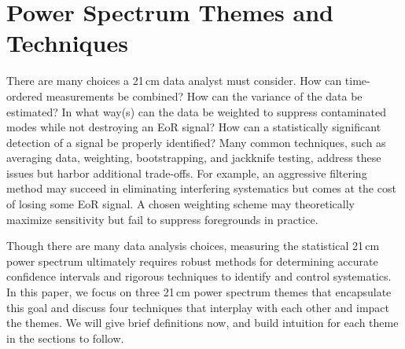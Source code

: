 \documentclass[preprint2,numberedappendix,tighten]{aastex6}  %
\begin{document}

\section{Power Spectrum Themes and Techniques}
\label{sec:Themes}

There are many choices a 21\,cm data analyst must consider. %
How can time-ordered measurements be combined? How can the 
variance of the data be estimated? In what way(s) can the data be weighted to suppress contaminated modes while not 
destroying an EoR signal? How can a statistically significant detection of a signal be properly identified? Many common techniques, such as 
averaging data, weighting, bootstrapping, and jackknife testing, address these issues but harbor additional trade-offs. For 
example, an aggressive filtering method may succeed in eliminating interfering systematics but comes at the cost of losing 
some EoR signal. A chosen weighting scheme may theoretically maximize sensitivity but fail to suppress foregrounds in practice. 

Though there are many data analysis choices, measuring the statistical 21\,cm power spectrum ultimately requires robust 
methods for determining accurate confidence intervals and rigorous techniques to identify and control systematics.  In this 
paper, we focus on three 21\,cm power spectrum themes that encapsulate this goal and discuss four techniques that interplay 
with each other and impact the themes. We will give brief definitions now, and build intuition for each theme in the sections to 
follow.

\end{document}
